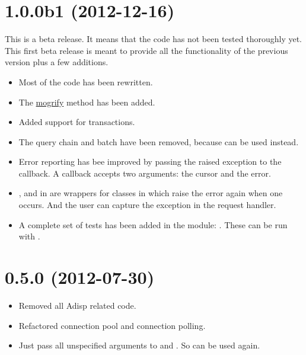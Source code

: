 \documentclass[letterpaper,10pt,english]{sphinxmanual}
\begin{document}
\section{1.0.0b1 (2012-12-16)}
\label{changelog:hstore}\label{changelog:b1-2012-12-16}
This is a beta release. It means that the code has not been tested thoroughly
yet. This first beta release is meant to provide all the functionality of the
previous version plus a few additions.
\begin{itemize}
\item {} 
Most of the code has been rewritten.

\item {} 
The \href{http://initd.org/psycopg/docs/cursor.html\#cursor.mogrify}{mogrify} method has been added.

\item {} 
Added support for transactions.

\item {} 
The query chain and batch have been removed, because  can be used instead.

\item {} 
Error reporting has bee improved by passing the raised exception to the callback.
A callback accepts two arguments: the cursor and the error.

\item {} 
,  and  in  are wrappers for
classes in  which raise the error again when one occurs.
And the user can capture the exception in the request handler.

\item {} 
A complete set of tests has been added in the  module: .
These can be run with .

\end{itemize}


\section{0.5.0 (2012-07-30)}
\label{changelog:id2}\label{changelog:mogrify}\begin{itemize}
\item {} 
Removed all Adisp related code.

\item {} 
Refactored connection pool and connection polling.

\item {} 
Just pass all unspecified arguments to  and . So
 can be used again.

\end{itemize}
\end{document}
